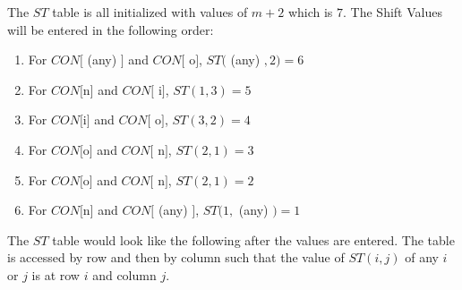 The $ST$ table is all initialized with values of $m+2$ which is $7$. The Shift Values will be entered in the following order:
\begin{enumerate}
\item For $CON[$ (any) $]$ and $CON[$ o$]$, $ST($ (any) $,2) = 6$
\item For $CON[$n$]$ and $CON[$ i$]$, $ST(1,3) = 5$
\item For $CON[$i$]$ and $CON[$ o$]$, $ST(3,2) = 4$
\item For $CON[$o$]$ and $CON[$ n$]$, $ST(2,1) = 3$
\item For $CON[$o$]$ and $CON[$ n$]$, $ST(2,1) = 2$
\item For $CON[$n$]$ and $CON[$ (any) $]$, $ST(1, $ (any) $) = 1$
\end{enumerate}
The $ST$ table would look like the following after the values are entered. The table is accessed by row and then by column such that the value of $ST(i,j)$ of any $i$ or $j$ is at row $i$ and column $j$. \\

